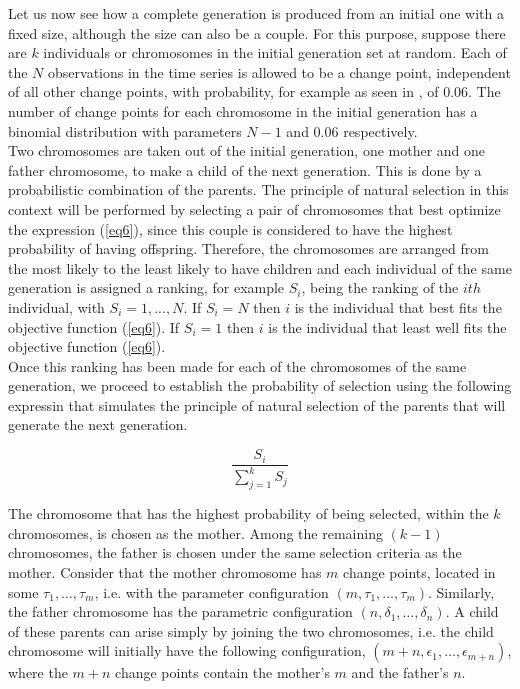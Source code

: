 \documentclass[APA,STIX1COL]{WileyNJD-v2}
\begin{document}
Let us now see how a complete generation is produced from an initial one with a fixed size, although the size can also be a couple. For this purpose, suppose there are $k$ individuals or chromosomes in the initial generation set at random. Each of the $N$ observations in the time series is allowed to be a change point, independent of all other change points, with probability, for example as seen in \cite{Li2012}, of 0.06. The number of change points for each chromosome in the initial generation has a binomial distribution with parameters $N-1$ and $0.06$ respectively.\\

Two chromosomes are taken out of the initial generation, one mother and one father chromosome, to make a child of the next generation. This is done by a probabilistic combination of the parents. The principle of natural selection in this context will be performed by selecting a pair of chromosomes that best optimize the expression (\ref{eq6}), since this couple is considered to have the highest probability of having offspring. Therefore, the chromosomes are arranged from the most likely to the least likely to have children and each individual of the same generation is assigned a ranking, for example $S_i$, being the ranking of the $ith$ individual, with $S_i=1,...,N$. If $S_i=N$ then $i$ is the individual that best fits the objective function (\ref{eq6}). If $S_i=1$ then $i$ is the individual that least well fits the objective function  (\ref{eq6}).\\

Once this ranking has been made for each of the chromosomes of the same generation, we proceed to establish the probability of selection using the  following expressin that simulates the principle of natural selection  of the parents that will generate the next generation.



\begin{equation}
\label{eq8}
\frac{S_i}{\sum_{j=1}^{k}S_j}    
\end{equation}



The chromosome that has the highest probability of being selected, within the $k$ chromosomes, is chosen as the mother. Among the remaining $(k-1)$ chromosomes, the father is chosen under the same selection criteria as the mother. Consider that the mother chromosome has $m$ change points, located in some $\tau_1,\dots,\tau_m$, i.e. with the parameter configuration $(m,\tau_1,\dots,\tau_m)$. Similarly, the father chromosome has the parametric configuration $(n,\delta_1,\dots,\delta_n)$. A child of these parents can arise simply by joining the two chromosomes, i.e. the child chromosome will initially have the following configuration, $(m+n,\epsilon_1,\dots,\epsilon_{m+n})$, where the $m+n$ change points contain the mother's $m$ and the father's $n$. 
\end{document}

